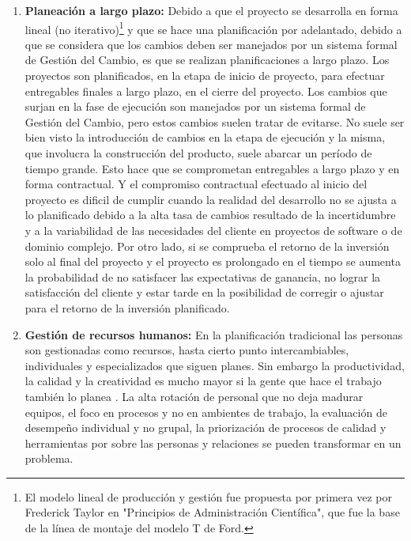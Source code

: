 \begin{enumerate}
\item \textbf{Planeación a largo plazo:} Debido a que el proyecto se desarrolla en forma lineal (no iterativo)\footnote{El modelo lineal de producción y gestión fue propuesta por primera vez por Frederick Taylor en "Principios de Administración Científica", que fue la base de la línea de montaje del modelo T de Ford.} y que se hace una planificación por adelantado, debido a que se considera que los cambios deben ser manejados por un sistema formal de Gestión del Cambio, es que se realizan planificaciones a largo plazo. Los proyectos son planificados, en la etapa de inicio de proyecto, para efectuar entregables finales a largo plazo, en el cierre del proyecto. Los cambios que surjan en la fase de ejecución son manejados por un sistema formal de Gestión del Cambio, pero estos cambios suelen tratar de evitarse. No suele ser bien visto la introducción de cambios en la etapa de ejecución y la misma, que involucra la construcción del producto, suele abarcar un período de tiempo grande. Esto hace que se comprometan entregables a largo plazo y en forma contractual. Y el compromiso contractual efectuado al inicio del proyecto es dificil de cumplir cuando la realidad del desarrollo no se ajusta a lo planificado debido a la alta tasa de cambios resultado de la incertidumbre y a la variabilidad de las necesidades del cliente en proyectos de software o de dominio complejo. Por otro lado, si se comprueba el retorno de la inversión solo al final del proyecto y el proyecto es prolongado en el tiempo se aumenta la probabilidad de no satisfacer las expectativas de ganancia, no lograr la satisfacción del cliente y estar tarde en la posibilidad de corregir o ajustar para el retorno de la inversión planificado.

\item \textbf{Gestión de recursos humanos:} En la planificación tradicional las personas son gestionadas como recursos, hasta cierto punto intercambiables, individuales y especializados que siguen planes. Sin embargo la productividad, la calidad y la creatividad es mucho mayor si la gente que hace el trabajo también lo planea \cite{Ken-Schwaber-2011}. La alta rotación de personal que no deja madurar equipos, el foco en procesos y no en ambientes de trabajo, la evaluación de desempeño individual y no grupal, la priorización de procesos de calidad y herramientas por sobre las personas y relaciones se pueden transformar en un problema.


\end{enumerate}
